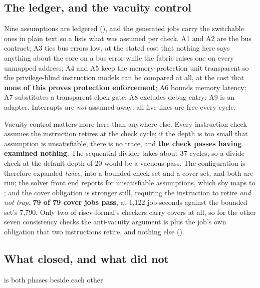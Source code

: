 \subsection{The ledger, and the vacuity control}

Nine assumptions are ledgered (), and the
generated jobs carry the switchable ones in plain text so a 
lists what was assumed per check. A1 and A2 are the bus contract; A3
ties bus errors low, at the stated cost that nothing here says anything
about the core on a bus error while the fabric raises one on every
unmapped address; A4 and A5 keep the memory-protection unit transparent
so the privilege-blind instruction models can be compared at all, at the
cost that \textbf{none of this proves protection enforcement}; A6 bounds
memory latency; A7 substitutes a transparent clock gate; A8 excludes
debug entry; A9 is an adapter. Interrupts are \emph{not} assumed away:
all five lines are free every cycle.

Vacuity control matters more here than anywhere else. Every instruction check assumes the instruction retires at the check cycle; if the depth is too small that assumption is unsatisfiable, there is no trace, and \textbf{the check passes having examined nothing}. The sequential divider takes about 37 cycles, so a divide check at the default depth of 20 would be a vacuous pass. The configuration is
therefore expanded \emph{twice}, into a bounded-check set and a cover
set, and both are run; the solver front end reports  for
unsatisfiable assumptions, which sby maps to ; and the cover obligation is stronger still, requiring the instruction to retire \emph{and not trap}. \textbf{79 of 79 cover jobs
pass}, at 1,122 job-seconds against the bounded set's 7,790. Only two of
riscv-formal's checkers carry covers at all, so for the other seven
consistency checks the anti-vacuity argument is  plus the
 job's own obligation that two instructions retire, and
nothing else ().

\subsection{What closed, and what did not}

 is both phases beside each other.

